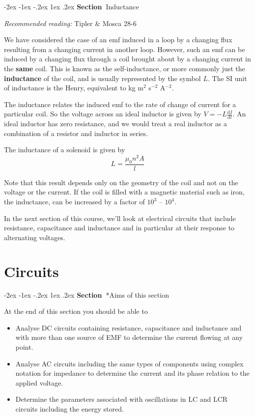 \documentclass[
]{book}
\makeatletter
\renewcommand\section{%
\@startsection{section}{1}{\z@}%
              {-2ex \@plus -1ex \@minus -.2ex}%
              {1ex \@plus .2ex}%
              {\sffamily\bfseries\large\noindent Section~}}
\numberwithin{equation}{section}
\makeatother
\begin{document}
\hypertarget{inductance}{%
\section{Inductance}\label{inductance}}

\emph{Recommended reading:} Tipler \& Mosca 28-6

We have considered the case of an emf induced in a loop by a changing
flux resulting from a changing current in another loop. However, such an
emf can be induced by a changing flux through a coil brought about by a
changing current in the \textbf{same} coil. This is known as the
self-inductance, or more commonly just the \textbf{inductance} of the coil,
and is usually represented by the symbol \(L\). The SI unit of inductance
is the Henry, equivalent to kg m\(^2\) s\(^{-2}\) A\(^{-2}\).

The inductance relates the induced emf to the rate of change of current
for a particular coil. So the voltage across an ideal inductor is given
by \(V = -L \frac{\mathrm{d} I}{\mathrm{d} t}\). An ideal inductor has zero resistance,
and we would treat a real inductor as a combination of a resistor and
inductor in series.

The inductance of a solenoid is given by \[L = \frac{\mu_0 n^2 A}{l}\]

Note that this result depends only on the geometry of the coil and not
on the voltage or the current. If the coil is filled with a magnetic
material such as iron, the inductance, can be increased by a factor of
\(10^3\) -- \(10^4\).

In the next section of this course, we'll look at electrical circuits
that include resistance, capacitance and inductance and in particular at
their response to alternating voltages.

\hypertarget{circuits}{%
\chapter{Circuits}\label{circuits}}

\hypertarget{aims-of-this-section-1}{%
\section*{Aims of this section}\label{aims-of-this-section-1}}

At the end of this section you should be able to

\begin{itemize}
\item
  Analyse DC circuits containing resistance, capacitance and
  inductance and with more than one source of EMF to determine the
  current flowing at any point.
\item
  Analyse AC circuits including the same types of components using
  complex notation for impedance to determine the current and its
  phase relation to the applied voltage.
\item
  Determine the parameters associated with oscillations in LC and LCR
  circuits including the energy stored.
\end{itemize}
\end{document}
